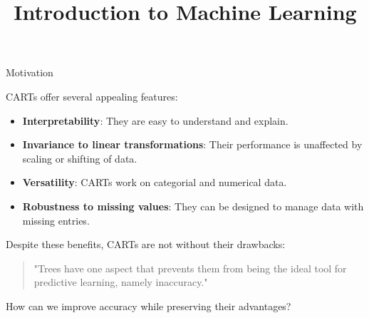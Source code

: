 \documentclass[11pt,compress,t,notes=noshow, xcolor=table]{beamer}
\title{Introduction to Machine Learning}
\institute{\href{https://compstat-lmu.github.io/lecture_i2ml/}{compstat-lmu.github.io/lecture\_i2ml}}
\date{}
\begin{document}
\sloppy


\begin{vbframe}{Motivation}

CARTs offer several appealing features:

\begin{itemize}
  \item \textbf{Interpretability}: They are easy to understand and explain.
  \item \textbf{Invariance to linear transformations}: Their performance is unaffected by scaling or shifting of data.
  \item \textbf{Versatility}: CARTs work on categorial and numerical data.
  \item \textbf{Robustness to missing values}: They can be designed to manage data with missing entries.
\end{itemize}

\vspace{1em}
Despite these benefits, CARTs are not without their drawbacks:
\vspace{1em}

\begin{quotation}
"Trees have one aspect that prevents them from being the ideal tool for predictive learning, namely inaccuracy."
\end{quotation}

\vspace{1em}
How can we improve accuracy while preserving their advantages?

\end{vbframe}
\end{document}
